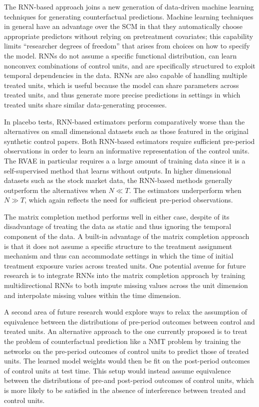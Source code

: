 The RNN-based approach joins a new generation of data-driven machine learning techniques for generating counterfactual predictions. Machine learning techniques in general have an advantage over the SCM in that they automatically choose appropriate predictors without relying on pretreatment covariates; this capability limits ``researcher degrees of freedom'' that arises from choices on how to specify the model. RNNs do not assume a specific functional distribution, can learn nonconvex combinations of control units, and are specifically structured to exploit temporal dependencies in the data. RNNs are also capable of handling multiple treated units, which is useful because the model can share parameters across treated units, and thus generate more precise predictions in settings in which treated units share similar data-generating processes. 

In placebo tests, RNN-based estimators perform comparatively worse than the alternatives on small dimensional datasets such as those featured in the original synthetic control papers. Both RNN-based estimators require sufficient pre-period observations in order to learn an informative representation of the control units. The RVAE in particular requires a a large amount of training data since it is a self-supervised method that learns without outputs. In higher dimensional datasets such as the stock market data, the RNN-based methods generally outperform the alternatives when  $N \ll T$. The estimators underperform when $N \gg T$, which again reflects the need for sufficient pre-period observations. 

The matrix completion method performs well in either case, despite of its disadvantage of treating the data as static and thus ignoring the temporal component of the data. A built-in advantage of the matrix completion approach is that it does not assume a specific structure to the treatment assignment mechanism and thus can accommodate settings in which the time of initial treatment exposure varies across treated units. One potential avenue for future research is to integrate RNNs into the matrix completion approach by training multidirectional RNNs \citep[e.g.,][]{yoon2018estimating} to both impute missing values across the unit dimension and interpolate missing values within the time dimension. 

A second area of future research would explore ways to relax the assumption of equivalence between the distributions of pre-period outcomes between control and treated units. An alternative approach to the one currently proposed is to treat the problem of counterfactual prediction like a NMT problem by training the networks on the pre-period outcomes of control units to predict those of treated units. The learned model weights would then be fit on the post-period outcomes of control units at test time. This setup would instead assume equivalence between the distributions of pre-and post-period outcomes of control units, which is more likely to be satisfied in the absence of interference between treated and control units. 

\newpage


\begin{singlespace}
	\begin{footnotesize}
		\begin{multicols}{2}
			
		\end{multicols}
	\end{footnotesize}
\end{singlespace}

\itemize
